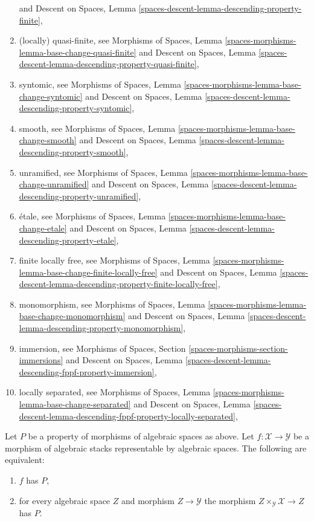 \begin{enumerate}
and
Descent on Spaces,
Lemma \ref{spaces-descent-lemma-descending-property-finite},
\item (locally) quasi-finite, see
Morphisms of Spaces,
Lemma \ref{spaces-morphisms-lemma-base-change-quasi-finite}
and
Descent on Spaces,
Lemma \ref{spaces-descent-lemma-descending-property-quasi-finite},
\item syntomic, see
Morphisms of Spaces,
Lemma \ref{spaces-morphisms-lemma-base-change-syntomic}
and
Descent on Spaces,
Lemma \ref{spaces-descent-lemma-descending-property-syntomic},
\item smooth, see
Morphisms of Spaces,
Lemma \ref{spaces-morphisms-lemma-base-change-smooth}
and
Descent on Spaces,
Lemma \ref{spaces-descent-lemma-descending-property-smooth},
\item unramified, see
Morphisms of Spaces,
Lemma \ref{spaces-morphisms-lemma-base-change-unramified}
and
Descent on Spaces,
Lemma \ref{spaces-descent-lemma-descending-property-unramified},
\item \'etale, see
Morphisms of Spaces,
Lemma \ref{spaces-morphisms-lemma-base-change-etale}
and
Descent on Spaces,
Lemma \ref{spaces-descent-lemma-descending-property-etale},
\item finite locally free, see
Morphisms of Spaces,
Lemma \ref{spaces-morphisms-lemma-base-change-finite-locally-free}
and
Descent on Spaces,
Lemma \ref{spaces-descent-lemma-descending-property-finite-locally-free},
\item monomorphism, see
Morphisms of Spaces,
Lemma \ref{spaces-morphisms-lemma-base-change-monomorphism}
and
Descent on Spaces,
Lemma \ref{spaces-descent-lemma-descending-property-monomorphism},
\item immersion, see
Morphisms of Spaces, Section \ref{spaces-morphisms-section-immersions}
and
Descent on Spaces,
Lemma \ref{spaces-descent-lemma-descending-fppf-property-immersion},
\item locally separated, see
Morphisms of Spaces,
Lemma \ref{spaces-morphisms-lemma-base-change-separated}
and
Descent on Spaces,
Lemma \ref{spaces-descent-lemma-descending-fppf-property-locally-separated},
\end{enumerate}

\begin{lemma}
\label{lemma-property-spaces-too}
Let $P$ be a property of morphisms of algebraic spaces as above.
Let $f : \mathcal{X} \to \mathcal{Y}$ be a morphism of algebraic stacks
representable by algebraic spaces. The following are equivalent:
\begin{enumerate}
\item $f$ has $P$,
\item for every algebraic space $Z$ and morphism $Z \to \mathcal{Y}$
the morphism $Z \times_\mathcal{Y} \mathcal{X} \to Z$ has $P$.
\end{enumerate}
\end{lemma}


